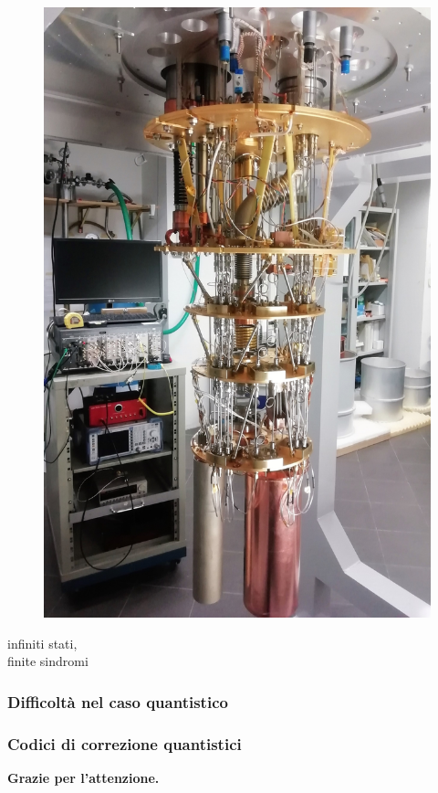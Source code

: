 \documentclass[aspectratio=169]{beamer}
\begin{document}
\begin{frame}
\begin{minipage}{0.32\textwidth}
\begin{figure}
			\includegraphics[scale=0.08]{quantistico.jpeg}
		\end{figure}
		infiniti stati, \\
		finite sindromi
	\end{minipage}

\end{frame}

\begin{frame}
	\frametitle{Difficoltà nel caso quantistico}
\end{frame}

\begin{frame}
	\frametitle{Codici di correzione quantistici}
\end{frame}

\begin{frame}
	\begin{center}
		\textbf{\LARGE Grazie per l'attenzione.}
	\end{center}
\end{frame}
\end{document}
